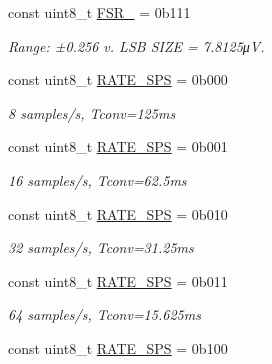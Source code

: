 \begin{DoxyCompactItemize}
const uint8\+\_\+t \mbox{\hyperlink{class_a_d_s1118_a5b0abd4476219e551141a10c1266c451}{F\+S\+R\+\_}} = 0b111
\begin{DoxyCompactList}\small\item\em Range\+: ±0.256 v. L\+SB S\+I\+ZE = 7.\+8125μV. \end{DoxyCompactList}\item 
\mbox{\label{class_a_d_s1118_a693fdcb47c270a6f3244df1eefdca4ca}} 
const uint8\+\_\+t \mbox{\hyperlink{class_a_d_s1118_a693fdcb47c270a6f3244df1eefdca4ca}{R\+A\+T\+E\+\_\+S\+PS}} = 0b000
\begin{DoxyCompactList}\small\item\em 8 samples/s, Tconv=125ms \end{DoxyCompactList}\item 
\mbox{\label{class_a_d_s1118_a6b92ca329799360f0dfc19bec589280c}} 
const uint8\+\_\+t \mbox{\hyperlink{class_a_d_s1118_a6b92ca329799360f0dfc19bec589280c}{R\+A\+T\+E\+\_\+S\+PS}} = 0b001
\begin{DoxyCompactList}\small\item\em 16 samples/s, Tconv=62.\+5ms \end{DoxyCompactList}\item 
\mbox{\label{class_a_d_s1118_af9f2d072f99bdce404c613135ba07829}} 
const uint8\+\_\+t \mbox{\hyperlink{class_a_d_s1118_af9f2d072f99bdce404c613135ba07829}{R\+A\+T\+E\+\_\+S\+PS}} = 0b010
\begin{DoxyCompactList}\small\item\em 32 samples/s, Tconv=31.\+25ms \end{DoxyCompactList}\item 
\mbox{\label{class_a_d_s1118_a6f1e5499c69409830f3dad1c0c66fc07}} 
const uint8\+\_\+t \mbox{\hyperlink{class_a_d_s1118_a6f1e5499c69409830f3dad1c0c66fc07}{R\+A\+T\+E\+\_\+S\+PS}} = 0b011
\begin{DoxyCompactList}\small\item\em 64 samples/s, Tconv=15.\+625ms \end{DoxyCompactList}\item 
\mbox{\label{class_a_d_s1118_a10ab539a0704cc42d3441f3c94a9a649}} 
const uint8\+\_\+t \mbox{\hyperlink{class_a_d_s1118_a10ab539a0704cc42d3441f3c94a9a649}{R\+A\+T\+E\+\_\+S\+PS}} = 0b100

\end{DoxyCompactItemize}
